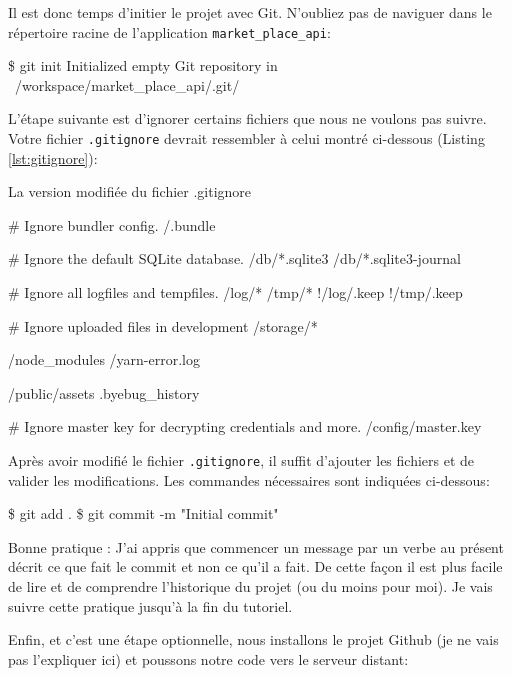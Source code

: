 \documentclass[]{report}
\begin{document}
    Il est donc temps d'initier le projet avec Git. N'oubliez pas de naviguer dans le répertoire racine de l'application \verb|market_place_api|:

    \begin{bashcode}
    \$ git init
    Initialized empty Git repository in ~/workspace/market_place_api/.git/
    \end{bashcode}

    L'étape suivante est d'ignorer certains fichiers que nous ne voulons pas suivre. Votre fichier \verb|.gitignore| devrait ressembler à celui montré ci-dessous (Listing \ref{lst:gitignore}):

    \begin{listing}
      \caption{La version modifiée du fichier .gitignore}
      \label{lst:gitignore}
      \begin{bashcode}
      # Ignore bundler config.
      /.bundle

      # Ignore the default SQLite database.
      /db/*.sqlite3
      /db/*.sqlite3-journal

      # Ignore all logfiles and tempfiles.
      /log/*
      /tmp/*
      !/log/.keep
      !/tmp/.keep

      # Ignore uploaded files in development
      /storage/*

      /node_modules
      /yarn-error.log

      /public/assets
      .byebug_history

      # Ignore master key for decrypting credentials and more.
      /config/master.key
      \end{bashcode}
    \end{listing}

    Après avoir modifié le fichier \verb|.gitignore|, il suffit d'ajouter les fichiers et de valider les modifications. Les commandes nécessaires sont indiquées ci-dessous:

    \begin{bashcode}
    \$ git add .
    \$ git commit -m "Initial commit"
    \end{bashcode}

    Bonne pratique : J'ai appris que commencer un message par un verbe au présent décrit ce que fait le commit et non ce qu'il a fait. De cette façon il est plus facile de lire et de comprendre l’historique du projet (ou du moins pour moi). Je vais suivre cette pratique jusqu'à la fin du tutoriel.

    Enfin, et c'est une étape optionnelle, nous installons le projet Github (je ne vais pas l'expliquer ici) et poussons notre code vers le serveur distant:
\end{document}
